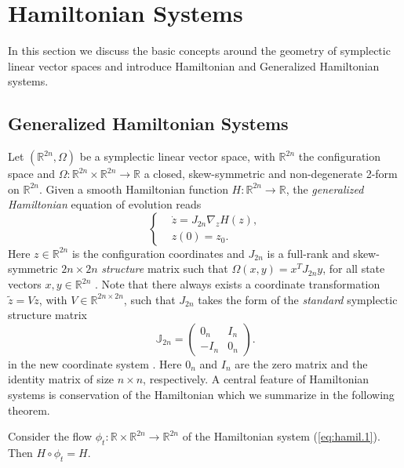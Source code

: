 \section{Hamiltonian Systems}
\label{sec:hamil}

In this section we discuss the basic concepts around the geometry of symplectic linear vector spaces and introduce Hamiltonian and Generalized Hamiltonian systems.

\subsection{Generalized Hamiltonian Systems}
\label{sec:hamil.1}

Let $(\mathbb R^{2n}, \Omega)$ be a symplectic linear vector space, with $\mathbb R^{2n}$ the configuration space and $\Omega:\mathbb R^{2n}\times\mathbb R^{2n} \to \mathbb R$ a closed, skew-symmetric and non-degenerate 2-form on $\mathbb R^{2n}$. Given a smooth Hamiltonian function $H:\mathbb R^{2n} \to \mathbb R$, the \emph{generalized Hamiltonian} equation of evolution reads
\begin{equation} \label{eq:hamil.1}
\left\{
\begin{aligned}
	& \dot z = J_{2n} \nabla_z H(z),  \\
	&  z(0) = z_0.
\end{aligned}
\right.
\end{equation}
Here $z\in \mathbb R^{2n}$ is the configuration coordinates and $J_{2n}$ is a full-rank and skew-symmetric $2n\times 2n$ \emph{structure} matrix such that $\Omega(x,y) = x^TJ_{2n}y$, for all state vectors $x,y\in \mathbb R^{2n}$ \cite{Marsden:2010:IMS:1965128}. Note that there always exists a coordinate transformation $\tilde z = V z$, with $V \in \mathbb R^{2n\times 2n}$, such that $J_{2n}$ takes the form of the \emph{standard} symplectic structure matrix
\begin{equation} \label{eq:hamil.2}
	\mathbb{J}_{2n} = 
	\begin{pmatrix}
	0_n & I_n \\
	-I_n & 0_n
	\end{pmatrix}.
\end{equation}
in the new coordinate system \cite{de2006symplectic}.
Here $0_n$ and $I_n$ are the zero matrix and the identity matrix of size $n\times n$, respectively. A central feature of Hamiltonian systems is conservation of the Hamiltonian which we summarize in the following theorem.
\begin{theorem} \label{thm:1}
Consider the flow $\phi_t:\mathbb R \times \mathbb R^{2n} \to \mathbb R^{2n}$ of the Hamiltonian system (\ref{eq:hamil.1}). Then $H \circ \phi_t = H$.
\end{theorem}

